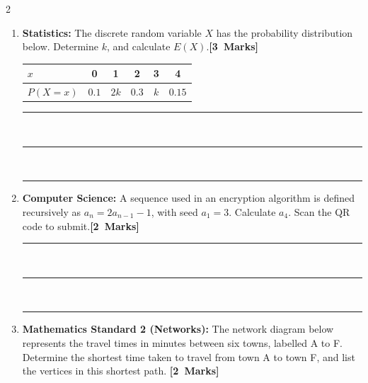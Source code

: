 \documentclass[11pt, a4paper]{article}
\begin{document}
\begin{multicols*}{2}
\begin{enumerate}[label=\textbf{\arabic*.}, leftmargin=*]
\item \textbf{Statistics:} The discrete random variable $X$ has the probability distribution below. Determine $k$, and calculate $E(X)$.\hfill\quad\mbox{\textbf{[3 Marks]}}

\begin{center}
\begin{tabular}{@{}lccccc@{}}
\toprule
$x$ & 0 & 1 & 2 & 3 & 4 \\ \midrule
$P(X=x)$ & $0.1$ & $2k$ & $0.3$ & $k$ & $0.15$ \\ \bottomrule
\end{tabular}
\end{center}

\vspace{0.2cm}
\noindent\rule{\linewidth}{0.4pt}\\[0.4cm]
\noindent\rule{\linewidth}{0.4pt}\\[0.4cm]
\noindent\rule{\linewidth}{0.4pt}

\item \textbf{Computer Science:} A sequence used in an encryption algorithm is defined recursively as $a_n = 2a_{n-1} - 1$, with seed $a_1 = 3$. Calculate $a_4$. Scan the QR code to submit.\hfill\quad\mbox{\textbf{[2 Marks]}}

\vspace{0.2cm}
\noindent\rule{\linewidth}{0.4pt}\\[0.4cm]
\noindent\rule{\linewidth}{0.4pt}\\[0.4cm]
\noindent\rule{\linewidth}{0.4pt}
\hfill

\item \textbf{Mathematics Standard 2 (Networks):} The network diagram below represents the travel times in minutes between six towns, labelled A to F. Determine the shortest time taken to travel from town A to town F, and list the vertices in this shortest path. \hfill\quad\mbox{\textbf{[2 Marks]}}

\begin{center}
\end{center}
\end{enumerate}
\end{multicols*}
\end{document}
